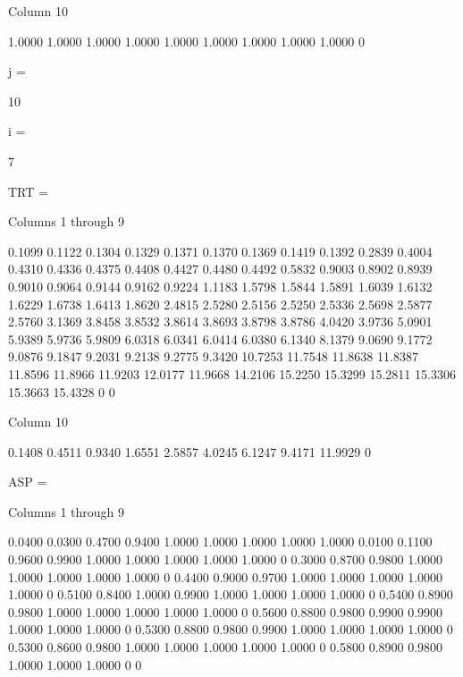   Column 10

    1.0000
    1.0000
    1.0000
    1.0000
    1.0000
    1.0000
    1.0000
    1.0000
    1.0000
         0


j =

    10


i =

     7


TRT =

  Columns 1 through 9

    0.1099    0.1122    0.1304    0.1329    0.1371    0.1370    0.1369    0.1419    0.1392
    0.2839    0.4004    0.4310    0.4336    0.4375    0.4408    0.4427    0.4480    0.4492
    0.5832    0.9003    0.8902    0.8939    0.9010    0.9064    0.9144    0.9162    0.9224
    1.1183    1.5798    1.5844    1.5891    1.6039    1.6132    1.6229    1.6738    1.6413
    1.8620    2.4815    2.5280    2.5156    2.5250    2.5336    2.5698    2.5877    2.5760
    3.1369    3.8458    3.8532    3.8614    3.8693    3.8798    3.8786    4.0420    3.9736
    5.0901    5.9389    5.9736    5.9809    6.0318    6.0341    6.0414    6.0380    6.1340
    8.1379    9.0690    9.1772    9.0876    9.1847    9.2031    9.2138    9.2775    9.3420
   10.7253   11.7548   11.8638   11.8387   11.8596   11.8966   11.9203   12.0177   11.9668
   14.2106   15.2250   15.3299   15.2811   15.3306   15.3663   15.4328         0         0

  Column 10

    0.1408
    0.4511
    0.9340
    1.6551
    2.5857
    4.0245
    6.1247
    9.4171
   11.9929
         0


ASP =

  Columns 1 through 9

    0.0400    0.0300    0.4700    0.9400    1.0000    1.0000    1.0000    1.0000    1.0000
    0.0100    0.1100    0.9600    0.9900    1.0000    1.0000    1.0000    1.0000    1.0000
         0    0.3000    0.8700    0.9800    1.0000    1.0000    1.0000    1.0000    1.0000
         0    0.4400    0.9000    0.9700    1.0000    1.0000    1.0000    1.0000    1.0000
         0    0.5100    0.8400    1.0000    0.9900    1.0000    1.0000    1.0000    1.0000
         0    0.5400    0.8900    0.9800    1.0000    1.0000    1.0000    1.0000    1.0000
         0    0.5600    0.8800    0.9800    0.9900    0.9900    1.0000    1.0000    1.0000
         0    0.5300    0.8800    0.9800    0.9900    1.0000    1.0000    1.0000    1.0000
         0    0.5300    0.8600    0.9800    1.0000    1.0000    1.0000    1.0000    1.0000
         0    0.5800    0.8900    0.9800    1.0000    1.0000    1.0000         0         0

